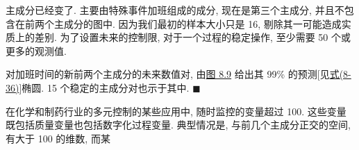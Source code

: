 主成分已经变了. 主要由特殊事件加班组成的成分, 现在是第三个主成分, 并且不包含在前两个主成分的图中. 因为我们最初的样本大小只是 16, 剔除其一可能造成实质上的差别. 为了设置未来的控制限, 对于一个过程的稳定操作, 至少需要 50 个或更多的观测值.

对加班时间的新前两个主成分的未来数值对, 由\hyperref[fig:8.9]{图 8.9} 给出其 99\% 的预测[见\hyperref[eq:8-36]{式(8-36)}]椭圆. 15 个稳定的主成分对也示于其中. \hfill$\blacksquare$

\begin{mvfigure}
\label{fig:8.9}
\end{mvfigure}

在化学和制药行业的多元控制的某些应用中, 随时监控的变量超过 100. 这些变量既包括质量变量也包括数字化过程变量. 典型情况是, 与前几个主成分正交的空间, 有大于 100 的维数, 而某
